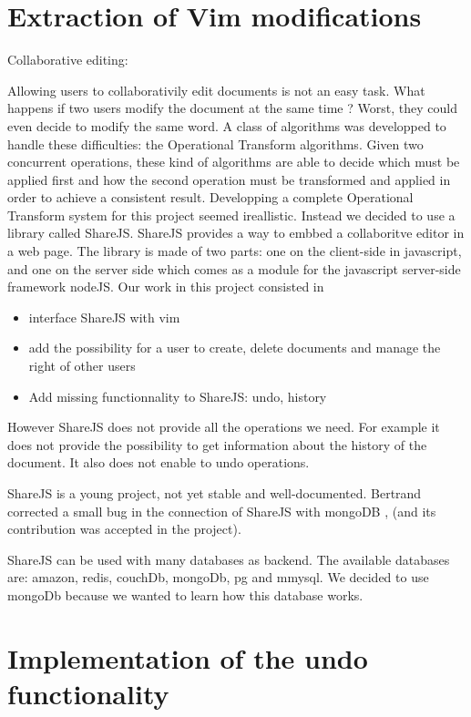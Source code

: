 \documentclass{llncs}
\begin{document}
\section{Extraction of Vim modifications}\label{sec:Others}
Collaborative editing:

Allowing users to collaborativily edit documents is not an easy task.
What happens if two users modify the document at the same time ?
Worst, they could even decide to modify the same word. A class
of algorithms was developped to handle these difficulties:
the Operational Transform algorithms. Given two concurrent operations, these kind
of algorithms are able to decide which must be applied first and how the second
operation must be transformed and applied in order to achieve a consistent result.
Developping a complete Operational Transform system for this project seemed ireallistic.
Instead we decided to use a library called ShareJS. 
ShareJS provides a way to embbed a collaboritve editor in a web page.
The library is made of two parts: one on the client-side in javascript, 
and one on the server side which comes as a module for the javascript server-side framework
nodeJS.
Our work in this project consisted in
\begin{itemize}
\item interface ShareJS with vim
\item add the possibility for a user to create, delete documents and manage the right of other users
\item Add missing functionnality to ShareJS: undo, history
\end{itemize}

However ShareJS does not provide all the operations we need.
For example it does not provide the possibility to get information about the history of the document.
It also does not enable to undo operations.

ShareJS is a young project, not yet stable and well-documented.
Bertrand corrected a small bug in the connection of ShareJS with mongoDB , (and its contribution was accepted in the project).

ShareJS can be used with many databases as backend. 
The available databases are: amazon, redis, couchDb, mongoDb, pg and mmysql.
We decided to use mongoDb because we wanted to learn how this database works.

\section{Implementation of the undo functionality}\label{sec:Others}
\end{document}
